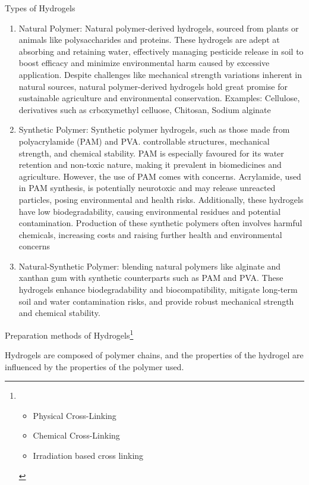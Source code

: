 \documentclass[../../main-notes.tex]{subfiles}
\begin{document}
Types of Hydrogels
\begin{enumerate}
    \item Natural Polymer: 
            Natural polymer-derived hydrogels, sourced from plants or animals like polysaccharides and proteins.
            These hydrogels are adept at absorbing and retaining water, effectively managing pesticide release in soil to boost efficacy and minimize environmental harm caused by excessive application.
            Despite challenges like mechanical strength variations inherent in natural sources, natural polymer-derived hydrogels hold great promise for sustainable agriculture and environmental conservation.
            Examples: Cellulose, derivatives such as crboxymethyl celluose, Chitosan, Sodium alginate
    \item Synthetic Polymer: 
            Synthetic polymer hydrogels, such as those made from polyacrylamide (PAM) and PVA.
            controllable structures, mechanical strength, and chemical stability.
            PAM is especially favoured for its water retention and non-toxic nature, making it prevalent in biomedicines and agriculture. 
            However, the use of PAM comes with concerns. 
            Acrylamide, used in PAM synthesis, is potentially neurotoxic and may release unreacted particles, posing environmental and health risks. 
            Additionally, these hydrogels have low biodegradability, causing environmental residues and potential contamination. 
            Production of these synthetic polymers often involves harmful chemicals, increasing costs and raising further health and environmental concerns
    \item Natural-Synthetic Polymer: 
            blending natural polymers like alginate and xanthan gum with synthetic counterparts such as PAM and PVA.
            These hydrogels enhance biodegradability and biocompatibility, mitigate long-term soil and water contamination risks, and provide robust mechanical strength and chemical stability.
\end{enumerate}


Preparation methods of Hydrogels\footnote{
    \begin{itemize}
        \item Physical Cross-Linking
        \item Chemical Cross-Linking
        \item Irradiation based cross linking
    \end{itemize}
}

Hydrogels are composed of polymer chains, and the properties of the hydrogel are influenced by the properties of the polymer used.
\end{document}
